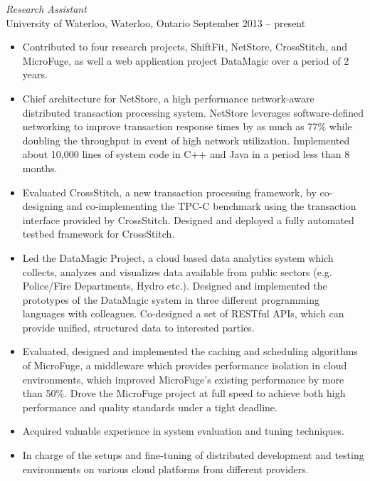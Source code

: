 \documentclass[10pt]{res} %
\begin{document}
\begin{resume}
{\sl Research Assistant} \\
University of Waterloo, Waterloo, Ontario \hfill September 2013 -- present
\begin{itemize} \itemsep -2pt %
\item Contributed to four research projects, ShiftFit, NetStore, CrossStitch, and MicroFuge, as well a web application project DataMagic over a period of 2 years.
\item Chief architecture for NetStore, a high performance network-aware distributed transaction processing system. NetStore leverages software-defined networking to improve transaction response times by as much as 77\% while doubling the throughput in event of high network utilization. Implemented about 10,000 lines of system code in C++ and Java in a period less than 8 months.
\item Evaluated CrossStitch, a new transaction processing framework, by co-designing and co-implementing the TPC-C benchmark using the transaction interface provided by CrossStitch. Designed and deployed a fully automated testbed framework for CrossStitch.
\item Led the DataMagic Project, a cloud based data analytics system which collects, analyzes and visualizes data available from public sectors (e.g. Police/Fire Departments, Hydro etc.). Designed and implemented the prototypes of the DataMagic system in three different programming languages with colleagues. Co-designed a set of RESTful APIs, which can provide unified, structured data to interested parties.
\item Evaluated, designed and implemented the caching and scheduling algorithms of
  MicroFuge, a middleware which provides performance isolation in cloud environments, which improved MicroFuge’s existing performance by more than 50\%. Drove the MicroFuge project at full speed to achieve both high performance and quality standards under a tight deadline.
\item Acquired valuable experience in system evaluation and tuning techniques.
\item In charge of the setups and fine-tuning of distributed development and testing
  environments on various cloud platforms from different providers.
\end{itemize}

\vspace{-6pt} %


\end{resume}
\end{document}
